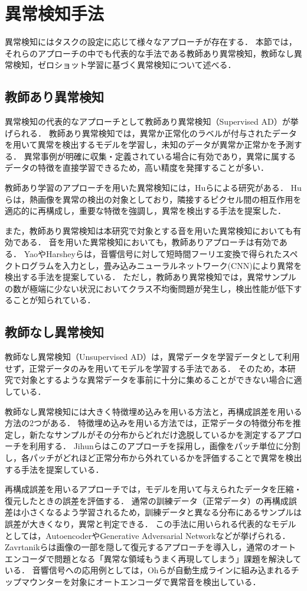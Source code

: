 \documentclass[../main]{subfiles}
\begin{document}
\section{異常検知手法}
\label{sec:related_work_anomaly}
異常検知にはタスクの設定に応じて様々なアプローチが存在する．
本節では，それらのアプローチの中でも代表的な手法である教師あり異常検知，教師なし異常検知，ゼロショット学習に基づく異常検知について述べる．
\subsection{教師あり異常検知}
異常検知の代表的なアプローチとして教師あり異常検知（Supervised AD）が挙げられる．
教師あり異常検知では，異常か正常化のラベルが付与されたデータを用いて異常を検出するモデルを学習し，未知のデータが異常か正常かを予測する．
異常事例が明確に収集・定義されている場合に有効であり，異常に属するデータの特徴を直接学習できるため，高い精度を発揮することが多い．

教師あり学習のアプローチを用いた異常検知には，Huらによる研究がある\cite{Hu}．
Huらは，熱画像を異常の検出の対象としており，隣接するピクセル間の相互作用を適応的に再構成し，重要な特徴を強調し，異常を検出する手法を提案した．

また，教師あり異常検知は本研究で対象とする音を用いた異常検知においても有効である．
音を用いた異常検知においても，教師ありアプローチは有効である．
YaoやHarsheyらは，音響信号に対して短時間フーリエ変換で得られたスペクトログラムを入力とし，畳み込みニューラルネットワーク(CNN)\cite{cnn}により異常を検出する手法を提案している\cite{hershey}\cite{yao}．
ただし，教師あり異常検知では，異常サンプルの数が極端に少ない状況においてクラス不均衡問題が発生し，検出性能が低下することが知られている\cite{nilanon}．
\subsection{教師なし異常検知}
教師なし異常検知（Unsupervised AD）は，異常データを学習データとして利用せず，正常データのみを用いてモデルを学習する手法である．
そのため，本研究で対象とするような異常データを事前に十分に集めることができない場合に適している．

教師なし異常検知には大きく特徴埋め込みを用いる方法と，再構成誤差を用いる方法の2つがある．
特徴埋め込みを用いる方法では，正常データの特徴分布を推定し，新たなサンプルがその分布からどれだけ逸脱しているかを測定するアプローチを利用する．
Jihunらはこのアプローチを採用し，画像をパッチ単位に分割し，各パッチがどれほど正常分布から外れているかを評価することで異常を検出する手法を提案している\cite{jihun}．

再構成誤差を用いるアプローチでは，モデルを用いて与えられたデータを圧縮・復元したときの誤差を評価する．
通常の訓練データ（正常データ）の再構成誤差は小さくなるよう学習されるため，訓練データと異なる分布にあるサンプルは誤差が大きくなり，異常と判定できる．
この手法に用いられる代表的なモデルとしては，AutoencoderやGenerative Adversarial Networkなどが挙げられる．
Zavrtanikらは画像の一部を隠して復元するアプローチを導入し，通常のオートエンコーダで問題となる「異常な領域もうまく再現してしまう」課題を解決している\cite{zavrtanik}．
音響信号への応用例としては，Ohらが自動生成ラインに組み込まれるチップマウンターを対象にオートエンコーダで異常音を検出している\cite{oh}．
\end{document}
